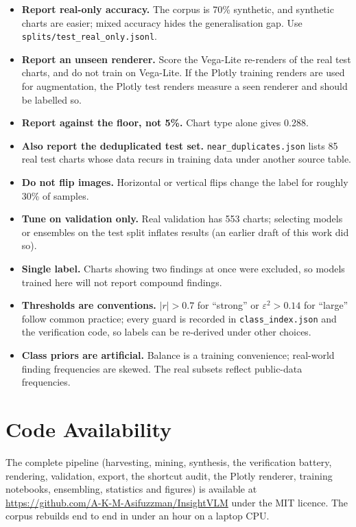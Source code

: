\documentclass[11pt,a4paper]{article}
\begin{document}
\begin{itemize}\itemsep0.2em
\item \textbf{Report real-only accuracy.} The corpus is 70\% synthetic, and
synthetic charts are easier; mixed accuracy hides the generalisation gap. Use
\texttt{splits/test\_real\_only.jsonl}.
\item \textbf{Report an unseen renderer.} Score the Vega-Lite re-renders of the real
test charts, and do not train on Vega-Lite. If the Plotly training renders are used for
augmentation, the Plotly test renders measure a seen renderer and should be labelled so.
\item \textbf{Report against the floor, not 5\%.} Chart type alone gives 0.288.
\item \textbf{Also report the deduplicated test set.} \texttt{near\_duplicates.json} lists 85 real test
charts whose data recurs in training data under another source table.
\item \textbf{Do not flip images.} Horizontal or vertical flips change the label for
roughly 30\% of samples.
\item \textbf{Tune on validation only.} Real validation has 553 charts; selecting
models or ensembles on the test split inflates results (an earlier draft of this work
did so).
\item \textbf{Single label.} Charts showing two findings at once were excluded, so
models trained here will not report compound findings.
\item \textbf{Thresholds are conventions.} $|r|>0.7$ for ``strong'' or
$\varepsilon^2>0.14$ for ``large'' follow common practice; every guard is recorded in
\texttt{class\_index.json} and the verification code, so labels can be re-derived
under other choices.
\item \textbf{Class priors are artificial.} Balance is a training convenience;
real-world finding frequencies are skewed. The real subsets reflect public-data
frequencies.
\end{itemize}

\section*{Code Availability}
The complete pipeline (harvesting, mining, synthesis, the verification battery,
rendering, validation, export, the shortcut audit, the Plotly renderer, training
notebooks, ensembling, statistics and figures) is available at \url{https://github.com/A-K-M-Asifuzzman/InsightVLM} under the MIT licence.
The corpus rebuilds end to end in under an hour on a laptop CPU.
\end{document}

